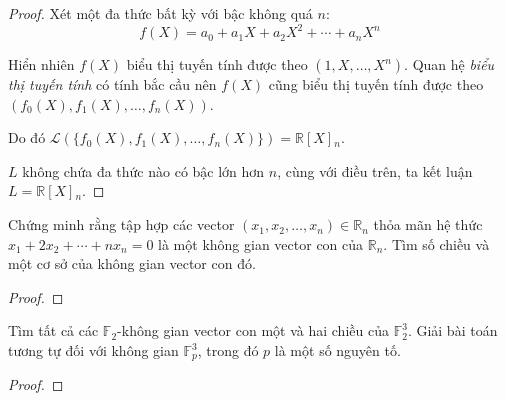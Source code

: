 \documentclass[class=linearalgebra,crop=false]{standalone}
\begin{document}
\begin{proof}
    \par Xét một đa thức bất kỳ với bậc không quá $n$:
        \[ f(X) = a_{0} + a_{1}X + a_{2}X^{2} + \cdots + a_{n}X^{n} \]
    \par Hiển nhiên $f(X)$ biểu thị tuyến tính được theo $(1, X, \ldots, X^{n})$. Quan hệ \textit{biểu thị tuyến tính} có tính bắc cầu nên $f(X)$ cũng biểu thị tuyến tính được theo $(f_{0}(X), f_{1}(X), \ldots, f_{n}(X))$.
    \par Do đó $\mathcal{L}(\{f_{0}(X), f_{1}(X),\ldots, f_{n}(X)\}) = \mathbb{R}[X]{}_{n}$.
    \par $L$ không chứa đa thức nào có bậc lớn hơn $n$, cùng với điều trên, ta kết luận $L = \mathbb{R}[X]{}_{n}$.
\end{proof}

\begin{exercise}Chứng minh rằng tập hợp các vector $(x_{1}, x_{2}, \ldots, x_{n})\in\mathbb{R}_{n}$ thỏa mãn hệ thức $x_{1} + 2x_{2} + \cdots + nx_{n} = 0$ là một không gian vector con của $\mathbb{R}_{n}$. Tìm số chiều và một cơ sở của không gian vector con đó.
\end{exercise}

\begin{proof}
\end{proof}

\begin{exercise}Tìm tất cả các $\mathbb{F}_{2}$-không gian vector con một và hai chiều của $\mathbb{F}^{3}_{2}$. Giải bài toán tương tự đối với không gian $\mathbb{F}^{3}_{p}$, trong đó $p$ là một số nguyên tố.
\end{exercise}

\begin{proof}
\end{proof}
\end{document}
